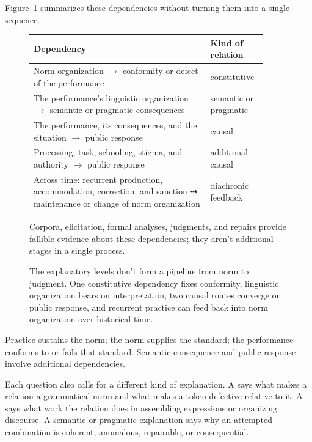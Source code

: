 \documentclass[12pt,letterpaper]{article}
\begin{document}
Figure~\ref{fig:levels} summarizes these dependencies without turning them into a
single sequence.
\begin{figure}[ht]
\centering
\scriptsize
\setlength{\tabcolsep}{5pt}
\begin{tabular}{@{}p{0.70\linewidth}p{0.20\linewidth}@{}}
\toprule
\textbf{Dependency} & \textbf{Kind of relation} \\
\midrule
Norm organization $\longrightarrow$ conformity or defect of the performance & constitutive \\
The performance's linguistic organization $\longrightarrow$ semantic or pragmatic consequences & semantic or pragmatic \\
The performance, its consequences, and the situation $\longrightarrow$ public response & causal \\
Processing, task, schooling, stigma, and authority $\longrightarrow$ public response & additional causal \\
\midrule
Across time: recurrent production, accommodation, correction, and sanction $\dashrightarrow$ maintenance or change of norm organization & diachronic feedback \\
\bottomrule
\end{tabular}
\vspace{0.6em}

{\footnotesize Corpora, elicitation, formal analyses, judgments, and repairs provide
fallible evidence about these dependencies; they aren't additional stages in a
single process.}
\caption{The explanatory levels don't form a pipeline from norm to judgment.
One constitutive dependency fixes conformity, linguistic organization bears on
interpretation, two causal routes converge on public response, and recurrent
practice can feed back into norm organization over historical time.}
\label{fig:levels}
\end{figure}

Practice sustains the norm; the norm supplies the standard; the performance
conforms to or fails that standard. Semantic consequence and public response
involve additional dependencies.

Each question also calls for a different kind of explanation. A  says what makes a relation a grammatical norm and what makes a token
defective relative to it. A  says what work the
relation does in assembling expressions or organizing discourse. A semantic or
pragmatic explanation says why an attempted combination is coherent, anomalous,
repairable, or consequential.
\end{document}
